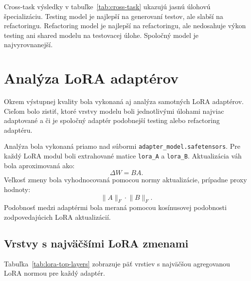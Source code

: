 \documentclass[11pt,a4paper]{article}
\begin{document}
Cross-task výsledky v tabuľke~\ref{tab:cross-task} ukazujú jasnú úlohovú špecializáciu. Testing model je najlepší na generovaní testov, ale slabší na refactoringu. Refactoring model je najlepší na refactoringu, ale nedosahuje výkon testing ani shared modelu na testovacej úlohe. Spoločný model je najvyrovnanejší.

\section{Analýza LoRA adaptérov}

Okrem výstupnej kvality bola vykonaná aj analýza samotných LoRA adaptérov. Cieľom bolo zistiť, ktoré vrstvy modelu boli jednotlivými úlohami najviac adaptované a či je spoločný adaptér podobnejší testing alebo refactoring adaptéru.

Analýza bola vykonaná priamo nad súbormi \texttt{adapter\_model.safetensors}. Pre každý LoRA modul boli extrahované matice \texttt{lora\_A} a \texttt{lora\_B}. Aktualizácia váh bola aproximovaná ako:
\begin{equation}
\Delta W = BA.
\end{equation}
Veľkosť zmeny bola vyhodnocovaná pomocou normy aktualizácie, prípadne proxy hodnoty:
\begin{equation}
\lVert A \rVert_F \cdot \lVert B \rVert_F.
\end{equation}
Podobnosť medzi adaptérmi bola meraná pomocou kosínusovej podobnosti zodpovedajúcich LoRA aktualizácií.

\subsection{Vrstvy s najväčšími LoRA zmenami}

Tabuľka~\ref{tab:lora-top-layers} zobrazuje päť vrstiev s najväčšou agregovanou LoRA normou pre každý adaptér.
\end{document}
